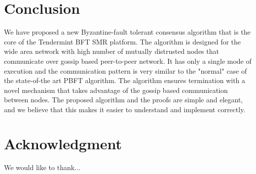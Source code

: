 \section{Conclusion}
\label{sec:conclusion}

We have proposed a new Byzantine-fault tolerant consensus algorithm that is the core of the Tendermint BFT SMR platform. The algorithm
is designed for the wide area network with high number of mutually distrusted nodes that communicate over gossip based peer-to-peer network. It has only a single mode of execution and the communication pattern is very similar to the "normal" case of the state-of-the art PBFT algorithm. The algorithm ensures termination with a novel mechanism that takes advantage of the gossip based communication between nodes.
The proposed algorithm and the proofs are simple and elegant, and we believe that this makes it easier to understand and implement correctly.   

\section*{Acknowledgment}

We would like to thank...